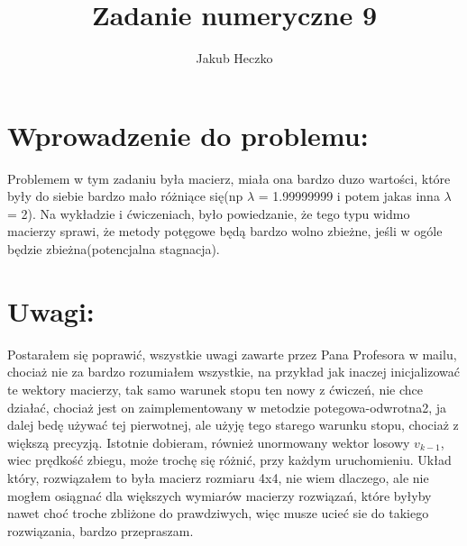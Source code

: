 \documentclass[12pt]{article}
\begin{document}
\title{{\Large}Zadanie numeryczne 9}
\date{}
\author{Jakub Heczko}

\maketitle

\section{Wprowadzenie do problemu: }
Problemem w tym zadaniu była macierz, miała ona bardzo duzo wartości, które były do siebie bardzo mało różniące się(np $\lambda$ = 1.99999999 i potem jakas inna $\lambda$ = 2). Na wykładzie i ćwiczeniach, było powiedzanie, że tego typu widmo macierzy sprawi, że metody potęgowe będą bardzo wolno zbieżne, jeśli w ogóle będzie zbieżna(potencjalna stagnacja).
\section{Uwagi: }
Postarałem się poprawić, wszystkie uwagi zawarte przez Pana Profesora w mailu, chociaż nie za bardzo rozumiałem wszystkie, na przykład jak inaczej inicjalizować te wektory macierzy, tak samo warunek stopu ten nowy z ćwiczeń, nie chce działać, chociaż jest on zaimplementowany w metodzie potegowa-odwrotna2, ja dalej bedę używać tej pierwotnej, ale użyję tego starego warunku stopu, chociaż z większą precyzją. Istotnie dobieram, również unormowany wektor losowy $v_{k-1}$, wiec prędkość zbiegu, może trochę się różnić, przy każdym uruchomieniu. Układ który, rozwiązałem to była macierz rozmiaru 4x4, nie wiem dlaczego, ale nie mogłem osiągnać dla większych wymiarów macierzy rozwiązań, które byłyby nawet choć troche zbliżone do prawdziwych, więc musze ucieć sie do takiego rozwiązania, bardzo przepraszam.
\end{document}
